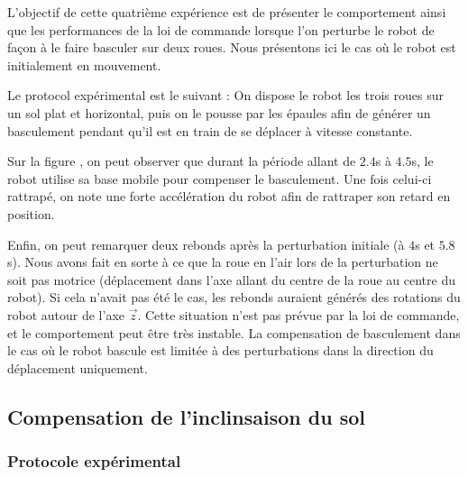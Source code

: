 	      
	      L'objectif de cette quatrième expérience  est de présenter le comportement ainsi que les performances de la loi de commande lorsque l'on perturbe le robot de façon à le faire basculer sur deux roues.
	      Nous présentons ici le cas où le robot est initialement en mouvement.
	      
	      Le protocol expérimental est le suivant :
	      On dispose le robot les trois roues sur un sol plat et horizontal, puis on le pousse par les épaules afin de générer un basculement pendant qu'il est en train de se déplacer à vitesse constante.
	     
	      
	   
	     Sur la figure , on peut observer que durant la période allant de $2.4$s à $4.5$s, le robot utilise sa base mobile pour compenser le basculement. 
	     Une fois celui-ci rattrapé, on note une forte accélération du robot afin de rattraper son retard en position.
	     
	     Enfin, on peut remarquer deux rebonds après la perturbation initiale (à $4$s et $5.8$s). 
	     Nous avons fait en sorte à ce que la roue en l'air lors de la perturbation ne soit pas motrice (déplacement dans l'axe allant du centre de la roue au centre du robot).
	     Si cela n'avait pas été le cas, les rebonds auraient générés des rotations du robot autour de l'axe $\vec{z}$.
	     Cette situation n'est pas prévue par la loi de commande, et le comportement peut être très instable. 
	     La compensation de basculement dans le cas où le robot bascule est limitée à des perturbations dans la direction du déplacement uniquement.
	      
	\subsection{Compensation de l'inclinsaison du sol}
	
	  
	  \subsubsection{Protocole expérimental}
	    
